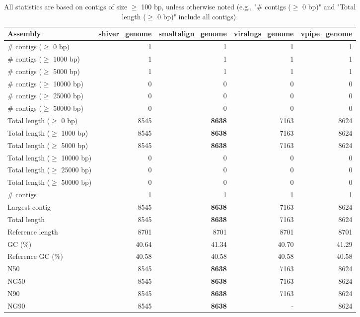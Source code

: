 \documentclass[12pt,a4paper]{article}
\begin{document}
\begin{table}[ht]
\begin{center}
\caption{All statistics are based on contigs of size $\geq$ 100 bp, unless otherwise noted (e.g., "\# contigs ($\geq$ 0 bp)" and "Total length ($\geq$ 0 bp)" include all contigs).}
\begin{tabular}{|l*{4}{|r}|}
\hline
Assembly & shiver\_genome & smaltalign\_genome & viralngs\_genome & vpipe\_genome \\ \hline
\# contigs ($\geq$ 0 bp) & 1 & 1 & 1 & 1 \\ \hline
\# contigs ($\geq$ 1000 bp) & 1 & 1 & 1 & 1 \\ \hline
\# contigs ($\geq$ 5000 bp) & 1 & 1 & 1 & 1 \\ \hline
\# contigs ($\geq$ 10000 bp) & 0 & 0 & 0 & 0 \\ \hline
\# contigs ($\geq$ 25000 bp) & 0 & 0 & 0 & 0 \\ \hline
\# contigs ($\geq$ 50000 bp) & 0 & 0 & 0 & 0 \\ \hline
Total length ($\geq$ 0 bp) & 8545 & {\bf 8638} & 7163 & 8624 \\ \hline
Total length ($\geq$ 1000 bp) & 8545 & {\bf 8638} & 7163 & 8624 \\ \hline
Total length ($\geq$ 5000 bp) & 8545 & {\bf 8638} & 7163 & 8624 \\ \hline
Total length ($\geq$ 10000 bp) & 0 & 0 & 0 & 0 \\ \hline
Total length ($\geq$ 25000 bp) & 0 & 0 & 0 & 0 \\ \hline
Total length ($\geq$ 50000 bp) & 0 & 0 & 0 & 0 \\ \hline
\# contigs & 1 & 1 & 1 & 1 \\ \hline
Largest contig & 8545 & {\bf 8638} & 7163 & 8624 \\ \hline
Total length & 8545 & {\bf 8638} & 7163 & 8624 \\ \hline
Reference length & 8701 & 8701 & 8701 & 8701 \\ \hline
GC (\%) & 40.64 & 41.34 & 40.70 & 41.29 \\ \hline
Reference GC (\%) & 40.58 & 40.58 & 40.58 & 40.58 \\ \hline
N50 & 8545 & {\bf 8638} & 7163 & 8624 \\ \hline
NG50 & 8545 & {\bf 8638} & 7163 & 8624 \\ \hline
N90 & 8545 & {\bf 8638} & 7163 & 8624 \\ \hline
NG90 & 8545 & {\bf 8638} & - & 8624 \\ \hline

\end{tabular}
\end{center}
\end{table}
\end{document}
